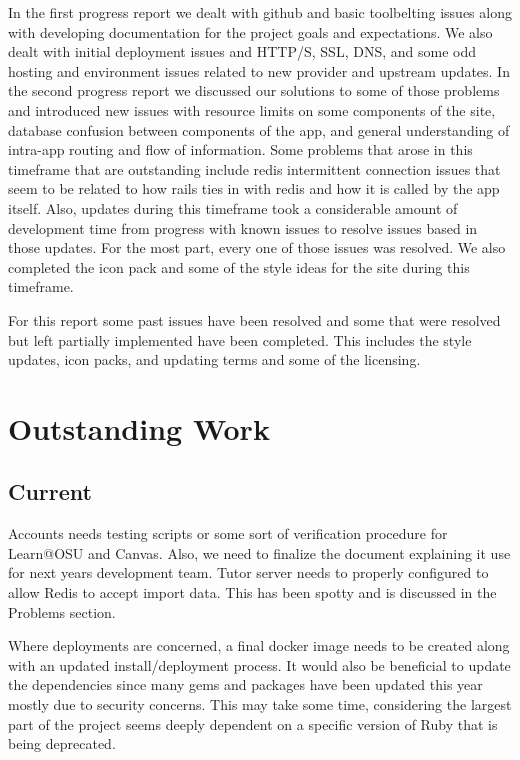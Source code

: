 \documentclass[onecolumn, draftclsnofoot,10pt, compsoc]{IEEEtran}
\begin{document}
In the first progress report we dealt with github and basic toolbelting issues along with developing documentation for the project goals and expectations. We also dealt with initial deployment issues and HTTP/S, SSL, DNS, and some odd hosting and environment issues related to new provider and upstream updates. 
In the second progress report we discussed our solutions to some of those problems and introduced new issues with resource limits on some components of the site, database confusion between components of the app, and general understanding of intra-app routing and flow of information. Some problems that arose in this timeframe that are outstanding include redis intermittent connection issues that seem to be related to how rails ties in with redis and how it is called by the app itself. Also, updates during this timeframe took a considerable amount of development time from progress with known issues to resolve issues based in those updates. For the most part, every one of those issues was resolved. We also completed the icon pack and some of the style ideas for the site during this timeframe. 

For this report some past issues have been resolved and some that were resolved but left partially implemented have been completed. This includes the style updates, icon packs, and updating terms and some of the licensing. 


\section{Outstanding Work}

\subsection{Current}
Accounts needs testing scripts or some sort of verification procedure for Learn@OSU and Canvas. Also, we need to finalize the document explaining it use for next years development team. Tutor server needs to properly configured to allow Redis to accept import data. This has been spotty and is discussed in the Problems section. 

Where deployments are concerned, a final docker image needs to be created along with an updated install/deployment process. It would also be beneficial to update the dependencies since many gems and packages have been updated this year mostly due to security concerns. This may take some time, considering the largest part of the project seems deeply dependent on a specific version of Ruby that is being deprecated. 
\end{document}
